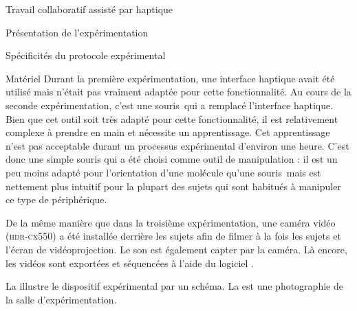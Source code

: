 \documentclass[myfrancais,ngerman,english,frenchb]{mythesis}
\begin{document}
\begin{mychapter}{Travail collaboratif assisté par haptique}
\begin{mysection}{Présentation de l'expérimentation}
\begin{mysubsection}{Spécificités du protocole expérimental}
\begin{mysubsubsection}{Matériel}
					Durant la première expérimentation, une interface haptique avait été utilisé mais n'était pas vraiment adaptée pour cette fonctionnalité.
					Au cours de la seconde expérimentation, c'est une souris~\myThreeD qui a remplacé l'interface haptique.
					Bien que cet outil soit très adapté pour cette fonctionnalité, il est relativement complexe à prendre en main et nécessite un apprentissage.
					Cet apprentissage n'est pas acceptable durant un processus expérimental d'environ une heure.
					C'est donc une simple souris \myUSB qui a été choisi comme outil de manipulation : il est un peu moins adapté pour l'orientation d'une molécule qu'une souris~\myThreeD mais est nettement plus intuitif pour la plupart des sujets qui sont habitués à manipuler ce type de périphérique.

					De la même manière que dans la troisième expérimentation, une caméra vidéo \mySony (\textsc{hdr-cx550}) a été installée derrière les sujets afin de filmer à la fois les sujets et l'écran de vidéoprojection.
					Le son est également capter par la caméra.
					Là encore, les vidéos sont exportées et séquencées \myafortiori à l'aide du logiciel \myiMovie.

					La  illustre le dispositif expérimental par un schéma.
					La  est une photographie de la salle d'expérimentation.


\end{mysubsubsection}
\end{mysubsection}
\end{mysection}
\end{mychapter}
\end{document}
